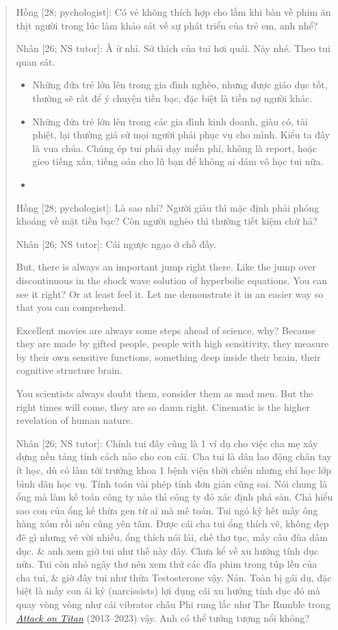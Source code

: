\documentclass[12pt]{article}
\begin{document}
\begin{quotation}
	{\sf Hồng [28; pychologist]}: Có vẻ không thích hợp cho lắm khi bàn về phim ăn thịt người trong lúc làm khảo sát về sự phát triển của trẻ em, anh nhể?
	
	{\sf Nhân [26; NS tutor]}: À ừ nhỉ. Sở thích của tui hơi quái. Này nhé. Theo tui quan sát.
	\begin{itemize}
		\item Những đứa trẻ lớn lên trong gia đình nghèo, nhưng được giáo dục tốt, thường sẽ rất để ý chuyện tiền bạc, đặc biệt là tiền nợ người khác.
		\item Những đứa trẻ lớn lên trong các gia đình kinh doanh, giàu có, tài phiệt, lại thường giả sử mọi người phải phục vụ cho mình. Kiểu ta đây là vua chúa. Chúng ép tui phải dạy miễn phí, không là report, hoặc gieo tiếng xấu, tiếng oán cho lũ bạn để không ai dám vô học tui nữa.
		\item 
	\end{itemize}
	{\sf Hồng [28; pychologist]}: Là sao nhỉ? Người giàu thì mặc định phải phóng khoáng về mặt tiền bạc? Còn người nghèo thì thường tiết kiệm chứ hả?
	
	{\sf Nhân [26; NS tutor]}: Cái ngược ngạo ở chỗ đấy. 
	
	But, there is always an important jump right there. Like the jump over discontinuous in the shock wave solution of hyperbolic equations. You can see it right? Or at least feel it. Let me demonstrate it in an easier way so that you can comprehend.
	
	Excellent movies are always some steps ahead of science, why? Because they are made by gifted people, people with high sensitivity, they measure by their own sensitive functions, something deep inside their brain, their cognitive structure brain.
	
	You scientists always doubt them, consider them as mad men. But the right times will come, they are so damn right. Cinematic is the higher revelation of human nature.
	
	{\sf Nhân [26; NS tutor]}: Chính tui đây cũng là 1 ví dụ cho việc cha mẹ xây dựng nền tảng tính cách nào cho con cái. Cha tui là dân lao động chân tay ít học, dù có làm tới trưởng khoa 1 bệnh viện thời chiến nhưng chỉ học lớp bình dân học vụ. Tính toán vài phép tính đơn giản cũng sai. Nói chung là ổng mà làm kế toán công ty nào thì công ty đó xác định phá sản. Chả hiểu sao con của ổng kế thừa gen từ ai mà mê toán. Tui ngó kỹ hết mấy ông hàng xóm rồi nên cũng yên tâm. Được cái cha tui ổng thích vẽ, không đẹp đẽ gì nhưng vẽ vời nhiều, ổng thích nói lái, chế thơ tục, mấy câu đùa dâm dục. \& anh xem giờ tui như thế này đây. Chưa kể về xu hướng tính dục nữa. Tui còn nhỏ ngây thơ nên xem thử các đĩa phim trong túp lều của cha tui, \& giờ đây tui như thừa Testosterone vậy. Nản. Toàn bị gái dụ, đặc biệt là mấy con ái kỷ (narcissists) lợi dụng cái xu hướng tính dục đó mà quay vòng vòng như cái vibrator châu Phi rung lắc như The Rumble trong \href{https://www.imdb.com/title/tt2560140}{\it Attack on Titan} (2013--2023) vậy. Anh có thể tưởng tượng nổi không?
		

\end{quotation}
\end{document}
